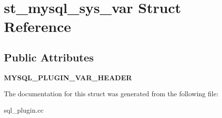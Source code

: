 \hypertarget{structst__mysql__sys__var}{}\section{st\+\_\+mysql\+\_\+sys\+\_\+var Struct Reference}
\label{structst__mysql__sys__var}
\subsection*{Public Attributes}
\begin{DoxyCompactItemize}
\item 
\mbox{\label{structst__mysql__sys__var_a721d0f3713173fa22ea561ba019cccbd}} 
{\bfseries M\+Y\+S\+Q\+L\+\_\+\+P\+L\+U\+G\+I\+N\+\_\+\+V\+A\+R\+\_\+\+H\+E\+A\+D\+ER}
\end{DoxyCompactItemize}


The documentation for this struct was generated from the following file\+:\begin{DoxyCompactItemize}
\item 
sql\+\_\+plugin.\+cc\end{DoxyCompactItemize}

